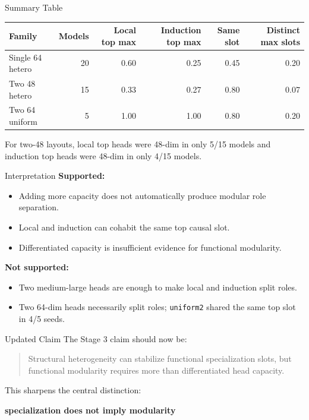 \documentclass[aspectratio=169]{beamer}
\begin{document}
\begin{frame}{Summary Table}
  \begin{center}
  \scriptsize
  \begin{tabular}{lrrrrr}
    \toprule
    Family & Models & Local top max & Induction top max & Same slot & Distinct max slots \\
    \midrule
    Single 64 hetero & 20 & 0.60 & 0.25 & 0.45 & 0.20 \\
    Two 48 hetero & 15 & 0.33 & 0.27 & 0.80 & 0.07 \\
    Two 64 uniform & 5 & 1.00 & 1.00 & 0.80 & 0.20 \\
    \bottomrule
  \end{tabular}
  \end{center}

  \vspace{0.7em}
  For two-48 layouts, local top heads were 48-dim in only 5/15 models and
  induction top heads were 48-dim in only 4/15 models.
\end{frame}

\begin{frame}{Interpretation}
  \textbf{Supported:}
  \begin{itemize}
    \item Adding more capacity does not automatically produce modular role separation.
    \item Local and induction can cohabit the same top causal slot.
    \item Differentiated capacity is insufficient evidence for functional modularity.
  \end{itemize}

  \vspace{0.6em}
  \textbf{Not supported:}
  \begin{itemize}
    \item Two medium-large heads are enough to make local and induction split roles.
    \item Two 64-dim heads necessarily split roles; \texttt{uniform2} shared the same top slot in 4/5 seeds.
  \end{itemize}
\end{frame}

\begin{frame}{Updated Claim}
  The Stage 3 claim should now be:

  \vspace{0.7em}
  \begin{quote}
    Structural heterogeneity can stabilize functional specialization slots, but
    functional modularity requires more than differentiated head capacity.
  \end{quote}

  \vspace{0.7em}
  This sharpens the central distinction:

  \begin{center}
    \textbf{specialization does not imply modularity}
  \end{center}
\end{frame}
\end{document}
